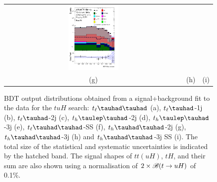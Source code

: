 \begin{figure}[H]
\begin{tabular}{@{}ccc@{}}
\includegraphics[width=0.29\textwidth]{figures/tuH_reg2mtau1b3jss.pdf}\\
(g) & (h)  & (i) \\
\end{tabular}
\caption{ BDT output distributions obtained from a signal+background fit to the data for the $tuH$ search: 
$t_{\ell}\thadhad$ (a), $t_{\ell}\tauhad$-1j (b),  $t_{\ell}\tauhad$-2j (c), $t_h\tlhad$-2j (d), $t_h\tlhad$-3j (e), $t_{\ell}\thadhad$-SS (f), $t_h\thadhad$-2j (g), $t_h\thadhad$-3j (h) and $t_h\thadhad$-3j SS (i).  
The total size of the statistical and systematic uncertainties is indicated by the hatched band. The signal shapes of $tt(uH)$, $tH$, and their sum are also shown using a normalisation of $2 \times\mathscr{B}(t\to uH)$ of 0.1\%. 
}
\label{fig:asimov_postfitbdtHu}
\end{figure}



